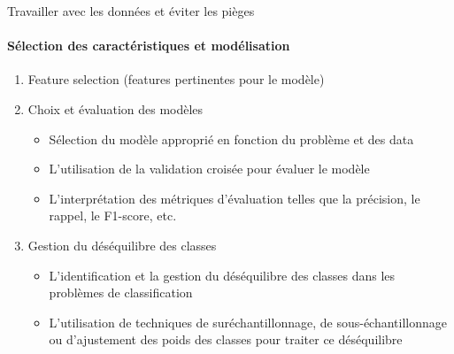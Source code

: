 \documentclass{beamer}
\begin{document}
\begin{frame}{Travailler avec les données et éviter les pièges}
	\framesubtitle{Sélection des caractéristiques et modélisation}
	\begin{enumerate}
		\item Feature selection (features pertinentes pour le modèle)
		\item Choix et évaluation des modèles
			\begin{itemize}
				\item Sélection du modèle approprié en fonction du problème et des data
				\item L'utilisation de la validation croisée pour évaluer le modèle
				\item L'interprétation des métriques d'évaluation telles que la précision, le rappel, le F1-score, etc.
			\end{itemize}
		\item Gestion du déséquilibre des classes 
		   \begin{itemize}
		   	\item L'identification et la gestion du déséquilibre des classes dans les problèmes de classification
		    \item 	L'utilisation de techniques de suréchantillonnage, de sous-échantillonnage ou d'ajustement des poids des classes pour traiter ce déséquilibre
		   \end{itemize}
			
	\end{enumerate}
\end{frame}
\end{document}
